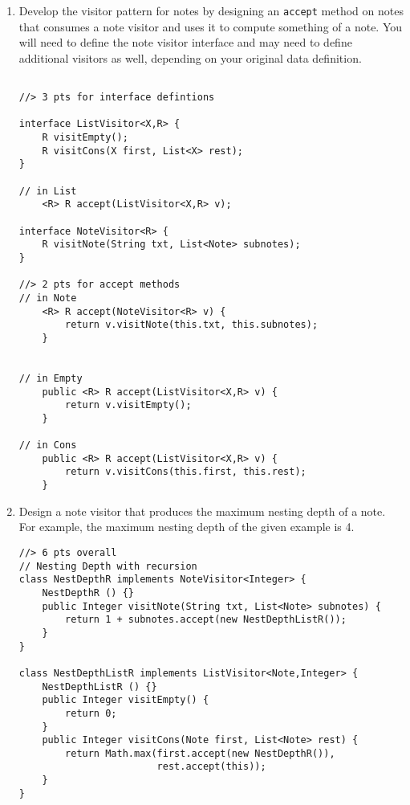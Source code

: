 \documentclass[12pt]{article}                   %
\newenvironment{solution}{\color{Red}}{}
\begin{document}
\begin{problem}
\begin{enumerate}
\newpage

\noindent
\item Develop the visitor pattern for notes by designing
  an \texttt{accept} method on notes that
  consumes a note visitor and uses it to compute something of a note.
  You will need to define the note visitor interface and may need to
  define additional visitors as well, depending on your original data
  definition.

\begin{solution}
\begin{verbatim}

//> 3 pts for interface defintions

interface ListVisitor<X,R> {
    R visitEmpty();
    R visitCons(X first, List<X> rest);
}

// in List
    <R> R accept(ListVisitor<X,R> v);

interface NoteVisitor<R> {
    R visitNote(String txt, List<Note> subnotes);
}

//> 2 pts for accept methods
// in Note
    <R> R accept(NoteVisitor<R> v) {
        return v.visitNote(this.txt, this.subnotes);
    }


// in Empty
    public <R> R accept(ListVisitor<X,R> v) {
        return v.visitEmpty();
    }

// in Cons
    public <R> R accept(ListVisitor<X,R> v) {
        return v.visitCons(this.first, this.rest);
    }
\end{verbatim}
\end{solution}

\newpage

\noindent
\item Design a note visitor that produces the maximum nesting depth of
  a note.  For example, the maximum nesting depth of the given example
  is 4.


\begin{solution}
\begin{verbatim}
//> 6 pts overall
// Nesting Depth with recursion
class NestDepthR implements NoteVisitor<Integer> {
    NestDepthR () {}
    public Integer visitNote(String txt, List<Note> subnotes) {
        return 1 + subnotes.accept(new NestDepthListR());
    }
}

class NestDepthListR implements ListVisitor<Note,Integer> {
    NestDepthListR () {}
    public Integer visitEmpty() {
        return 0;
    }
    public Integer visitCons(Note first, List<Note> rest) {
        return Math.max(first.accept(new NestDepthR()),
                        rest.accept(this));
    }
}
\end{verbatim}
\end{solution}


\end{enumerate}
\end{problem}
\end{document}
